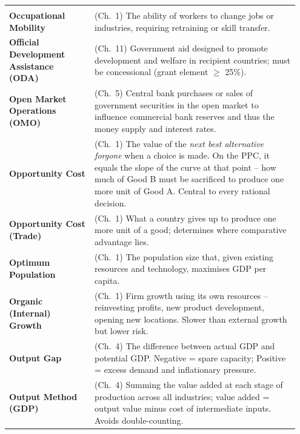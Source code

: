\documentclass[11pt, a4paper, twoside]{book}
\begin{document}
\begin{longtable}{@{}>{\RaggedRight\arraybackslash}p{0.28\linewidth}>{\RaggedRight\arraybackslash}p{0.67\linewidth}@{}}
\multicolumn{2}{@{}l}{\textbf{\Large\color{CurveNavy} O}} \\[2pt]
\textbf{Occupational Mobility} & (Ch.~1) The ability of workers to change jobs or industries, requiring retraining or skill transfer. \\
\textbf{Official Development Assistance (ODA)} & (Ch.~11) Government aid designed to promote development and welfare in recipient countries; must be concessional (grant element $\geq$ 25\%). \\
\textbf{Open Market Operations (OMO)} & (Ch.~5) Central bank purchases or sales of government securities in the open market to influence commercial bank reserves and thus the money supply and interest rates. \\
\textbf{Opportunity Cost} & (Ch.~1) The value of the \textit{next best alternative forgone} when a choice is made. On the PPC, it equals the slope of the curve at that point -- how much of Good B must be sacrificed to produce one more unit of Good A. Central to every rational decision. \\
\textbf{Opportunity Cost (Trade)} & (Ch.~1) What a country gives up to produce one more unit of a good; determines where comparative advantage lies. \\
\textbf{Optimum Population} & (Ch.~1) The population size that, given existing resources and technology, maximises GDP per capita. \\
\textbf{Organic (Internal) Growth} & (Ch.~1) Firm growth using its own resources -- reinvesting profits, new product development, opening new locations. Slower than external growth but lower risk. \\
\textbf{Output Gap} & (Ch.~4) The difference between actual GDP and potential GDP. Negative = spare capacity; Positive = excess demand and inflationary pressure. \\
\textbf{Output Method (GDP)} & (Ch.~4) Summing the value added at each stage of production across all industries; value added = output value minus cost of intermediate inputs. Avoids double-counting. \\


\end{longtable}
\end{document}
